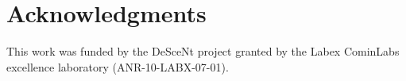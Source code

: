 
\section*{Acknowledgments}

This work was %
funded by
the DeSceNt project granted by the Labex CominLabs excellence laboratory
(ANR-10-LABX-07-01).



